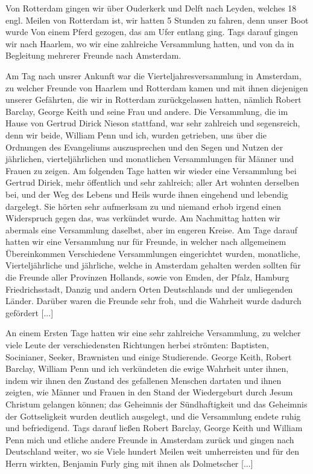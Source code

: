 Von Rotterdam gingen wir über Ouderkerk und Delft nach
Leyden, welches 18 engl. Meilen von Rotterdam ist, wir hatten
5 Stunden zu fahren, denn unser Boot wurde Von einem Pferd
gezogen, das am Ufer entlang ging. Tags darauf gingen wir
nach Haarlem, wo wir eine zahlreiche Versammlung hatten, und
von da in Begleitung mehrerer Freunde nach Amsterdam.

Am Tag nach unsrer Ankunft war die Vierteljahresversammlung 
in Amsterdam, zu welcher Freunde von Haarlem und Rotterdam
kamen und mit ihnen diejenigen unserer Gefährten, die wir
in Rotterdam zurückgelassen hatten, nämlich Robert Barclay,
George Keith und seine Frau und andere. Die Versammlung, die
im Hause von Gertrud Dirick Nieson 
stattfand, war sehr zahlreich und segensreich, denn wir beide, 
William Penn und ich, wurden
getrieben, uns über die Ordnungen des Evangeliums auszusprechen
und den Segen und Nutzen der jährlichen, vierteljährlichen und 
monatlichen Versammlungen für Männer und Frauen zu zeigen. Am
folgenden Tage hatten wir wieder eine Versammlung bei Gertrud
Diriek, mehr öffentlich und sehr 
zahlreich;  aller Art
wohnten derselben bei, und der Weg des Lebens und Heils wurde
ihnen eingehend und lebendig dargelegt. Sie hörten sehr 
aufmerksam zu und niemand erhob irgend einen Widerspruch gegen
das, was verkündet wurde. Am Nachmittag hatten wir abermals
eine Versammlung daselbst, aber im engeren Kreise. Am Tage
darauf hatten wir eine Versammlung nur für 
Freunde, in welcher
nach allgemeinem Übereinkommen Verschiedene Versammlungen 
eingerichtet wurden, monatliche, Vierteljährliche und jährliche, welche
in Amsterdam gehalten werden sollten für die Freunde aller
Provinzen Hollands, sowie von Emden, der 
Pfalz, Hamburg Friedrichsstadt, 
Danzig und andern Orten Deutschlands und der
umliegenden Länder. Darüber waren die Freunde sehr froh, und
die Wahrheit wurde dadurch gefördert [...]

An einem Ersten Tage hatten wir eine sehr zahlreiche Versammlung, 
zu welcher viele Leute der verschiedensten Richtungen
herbei strömten: Baptisten, Socinianer, 
Seeker, Brawnisten und
einige Studierende. George Keith, Robert Barclay, William Penn
und ich verkündeten die ewige Wahrheit unter ihnen, indem wir
ihnen den Zustand des gefallenen Menschen dartaten und ihnen
zeigten, wie Männer und Frauen in den Stand der Wiedergeburt
durch Jesum Christum gelangen können; das Geheimnis der Sündhaftigkeit 
und das Geheimnis der Gottseligkeit wurden deutlich
ausgelegt, und die Versammlung endete ruhig und befriedigend.
Tags darauf ließen Robert Barclay, George Keith und William
Penn mich und etliche andere Freunde in Amsterdam zurück und
gingen nach Deutschland weiter, wo sie Viele hundert Meilen weit
umherreisten und für den Herrn wirkten, Benjamin Furly ging mit
ihnen als Dolmetscher [...]

